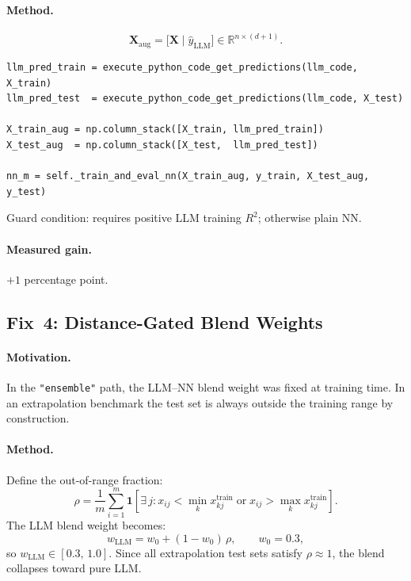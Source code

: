 \documentclass[11pt,a4paper]{article}
\begin{document}
\paragraph{Method.}

\[
  \mathbf{X}_{\text{aug}}
  = \bigl[\mathbf{X} \;\big|\; \hat{y}_{\text{LLM}}\bigr]
  \in \mathbb{R}^{n \times (d+1)}.
\]

\begin{lstlisting}[caption={LLM-feature augmentation.}]
llm_pred_train = execute_python_code_get_predictions(llm_code, X_train)
llm_pred_test  = execute_python_code_get_predictions(llm_code, X_test)

X_train_aug = np.column_stack([X_train, llm_pred_train])
X_test_aug  = np.column_stack([X_test,  llm_pred_test])

nn_m = self._train_and_eval_nn(X_train_aug, y_train, X_test_aug, y_test)
\end{lstlisting}

Guard condition: requires positive LLM training $R^2$; otherwise plain NN.

\paragraph{Measured gain.} $+1$ percentage point.

\subsection{Fix~4: Distance-Gated Blend Weights}

\paragraph{Motivation.}
In the \texttt{"ensemble"} path, the LLM--NN blend weight was fixed at training
time.  In an extrapolation benchmark the test set is always outside the
training range by construction.

\paragraph{Method.}
Define the out-of-range fraction:
\[
  \rho = \frac{1}{m}\sum_{i=1}^{m}
         \mathbf{1}\!\left[
           \exists\,j : x_{ij} < \min_k x_{kj}^{\text{train}}
                       \;\text{or}\;
                       x_{ij} > \max_k x_{kj}^{\text{train}}
         \right].
\]
The LLM blend weight becomes:
\[
  w_{\text{LLM}} = w_0 + (1-w_0)\,\rho, \qquad w_0 = 0.3,
\]
so $w_{\text{LLM}} \in [0.3,\,1.0]$.  Since all extrapolation test sets satisfy
$\rho \approx 1$, the blend collapses toward pure LLM.
\end{document}
